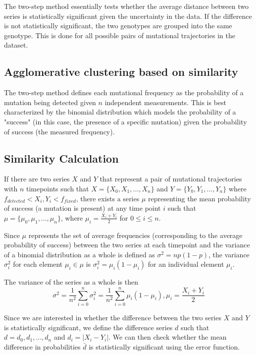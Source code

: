 \documentclass{report}
\begin{document}
The two-step method essentially tests whether the average distance between two series is statistically significant given the uncertainty in the data. If the difference is not statistically significant, the two genotypes are grouped into the same genotype. This is done for all possible pairs of mutational trajectories in the dataset.

\subsection{Agglomerative clustering based on similarity}

The two-step method defines each mutational frequency as the probability of a mutation being detected given $n$ independent measurements. This is best characterized by the binomial distribution which models the probability of a "success" (in this case, the presence of a specific mutation) given the probability of success (the measured frequency).

\subsection{Similarity Calculation}

If there are two series $X$ and $Y$ that represent a pair of mutational trajectories with $n$ timepoints such that $X=\{X_0,X_1,...,X_n\}$
and $Y=\{Y_0,Y_1,...,Y_n\}$ where $f_{detected} < X_i,Y_i < f_{fixed}$, there exists a series $\mu$ representing the mean probability of success
(a mutation is present) at any time point $i$ such that $\mu=\{\mu_0,\mu_1,...,\mu_n\}$, where $\mu_i=\frac{X_i+Y_i}{2}$ for $0\le i \le n$.

Since $\mu$ represents the set of average frequencies (corresponding to the average probability of success) between the two series at each timepoint and the variance of a binomial distribution as a whole is defined as $\sigma^2=np(1-p)$, the variance $\sigma_i^2$ for each element $\mu_i \in \mu$ is $\sigma_i^2=\mu_i(1-\mu_i)$ for an individual element $\mu_i$.

The variance of the series as a whole is then
\begin{equation}
\sigma^2 = \frac{1}{n^2}\sum_{i=0}^n \sigma_i^2=\frac{1}{n^2}\sum_{i=0}^n \mu_i(1-\mu_i),
\mu_i=\frac{X_i+Y_i}{2}
\end{equation}

Since we are interested in whether the difference between the two series $X$ and $Y$ is statistically significant, we define the difference series $d$ such that $d={d_0,d_1,...,d_n}$ and $d_i=|X_i-Y_i|$. We can then check whether the mean difference in probabilities $\bar{d}$ is
statistically significant using the error function.
\end{document}
